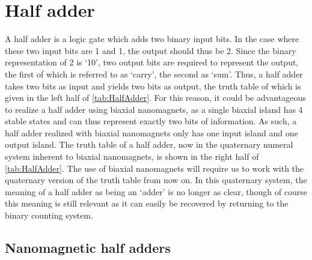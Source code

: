 \documentclass[11pt,a4paper,english]{article}
\begin{document}
\clearpage
\section{Half adder}
A half adder is a logic gate which adds two binary input bits. In the case where these two input bits are 1 and 1, the output should thus be 2. Since the binary representation of 2 is `10', two output bits are required to represent the output, the first of which is referred to as `carry', the second as `sum'. Thus, a half adder takes two bits as input and yields two bits as output, the truth table of which is given in the left half of \cref{tab:HalfAdder}. For this reason, it could be advantageous to realize a half adder using biaxial nanomagnets, as a single biaxial island has 4 stable states and can thus represent exactly two bits of information. As such, a half adder realized with biaxial nanomagnets only has one input island and one output island. The truth table of a half adder, now in the quaternary numeral system inherent to biaxial nanomagnets, is shown in the right half of \cref{tab:HalfAdder}. The use of biaxial nanomagnets will require us to work with the quaternary version of the truth table from now on. In this quaternary system, the meaning of a half adder as being an `adder' is no longer as clear, though of course this meaning is still relevant as it can easily be recovered by returning to the binary counting system. \par
{}
\subsection{Nanomagnetic half adders}
\end{document}
